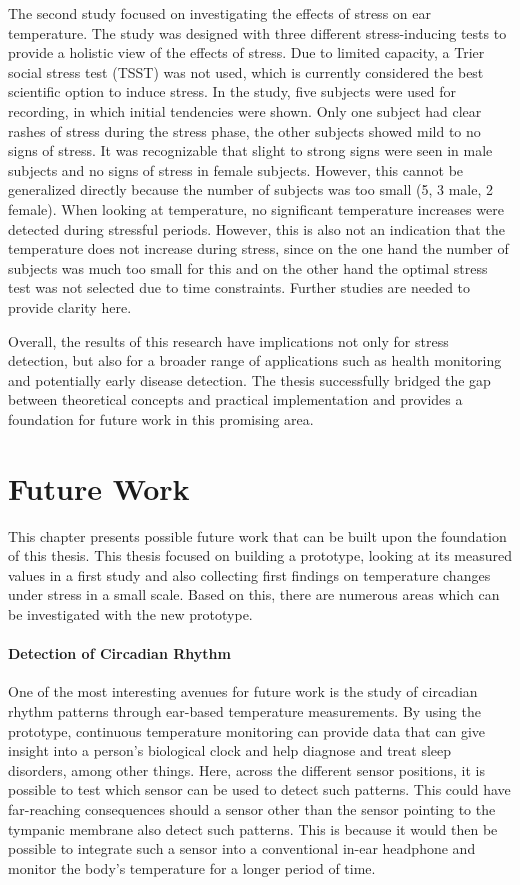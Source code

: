 The second study focused on investigating the effects of stress on ear temperature. 
The study was designed with three different stress-inducing tests to provide a holistic view of the effects of stress. 
Due to limited capacity, a Trier social stress test (TSST) was not used, which is currently considered the best scientific option to induce stress.
In the study, five subjects were used for recording, in which initial tendencies were shown.
Only one subject had clear rashes of stress during the stress phase, the other subjects showed mild to no signs of stress.
It was recognizable that slight to strong signs were seen in male subjects and no signs of stress in female subjects.
However, this cannot be generalized directly because the number of subjects was too small (5, 3 male, 2 female).
When looking at temperature, no significant temperature increases were detected during stressful periods.
However, this is also not an indication that the temperature does not increase during stress, since on the one hand the number of subjects was much too small for this and on the other hand the optimal stress test was not selected due to time constraints.
Further studies are needed to provide clarity here.

Overall, the results of this research have implications not only for stress detection, but also for a broader range of applications such as health monitoring and potentially early disease detection.
The thesis successfully bridged the gap between theoretical concepts and practical implementation and provides a foundation for future work in this promising area.

\section{Future Work}
This chapter presents possible future work that can be built upon the foundation of this thesis.
This thesis focused on building a prototype, looking at its measured values in a first study and also collecting first findings on temperature changes under stress in a small scale.
Based on this, there are numerous areas which can be investigated with the new prototype.

\paragraph{Detection of Circadian Rhythm}
One of the most interesting avenues for future work is the study of circadian rhythm patterns through ear-based temperature measurements. 
By using the prototype, continuous temperature monitoring can provide data that can give insight into a person's biological clock and help diagnose and treat sleep disorders, among other things.
Here, across the different sensor positions, it is possible to test which sensor can be used to detect such patterns.
This could have far-reaching consequences should a sensor other than the sensor pointing to the tympanic membrane also detect such patterns. 
This is because it would then be possible to integrate such a sensor into a conventional in-ear headphone and monitor the body's temperature for a longer period of time.


